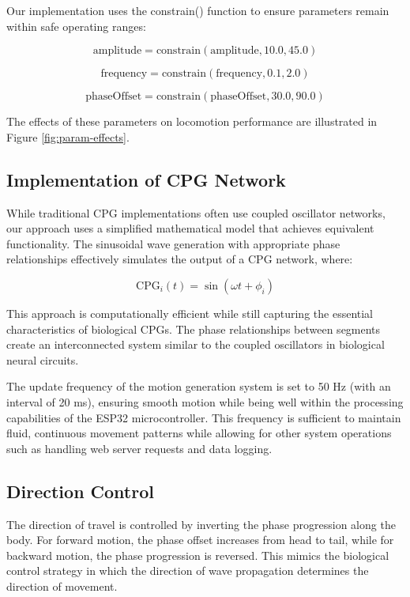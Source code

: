 \documentclass[12pt,a4paper]{report}
\begin{document}
Our implementation uses the constrain() function to ensure parameters remain within safe operating ranges:

\begin{equation}
\text{amplitude} = \text{constrain}(\text{amplitude}, 10.0, 45.0)
\end{equation}

\begin{equation}
\text{frequency} = \text{constrain}(\text{frequency}, 0.1, 2.0)
\end{equation}

\begin{equation}
\text{phaseOffset} = \text{constrain}(\text{phaseOffset}, 30.0, 90.0)
\end{equation}

The effects of these parameters on locomotion performance are illustrated in Figure \ref{fig:param-effects}.

\subsection{Implementation of CPG Network}
While traditional CPG implementations often use coupled oscillator networks, 
 our approach uses a simplified mathematical model that achieves equivalent functionality. The sinusoidal wave generation with appropriate phase relationships effectively simulates the output of a CPG network, where:

\begin{equation}
\text{CPG}_i(t) = \sin(\omega t + \phi_i)
\end{equation}

This approach is computationally efficient while still capturing the essential characteristics of biological CPGs. The phase relationships between segments create an interconnected system similar to the coupled oscillators in biological neural circuits.

The update frequency of the motion generation system is set to 50 Hz (with an interval of 20 ms), ensuring smooth motion while being well within the processing capabilities of the ESP32 microcontroller. This frequency is sufficient to maintain fluid, continuous movement patterns while allowing for other system operations such as handling web server requests and data logging.

\subsection{Direction Control}
The direction of travel is controlled by inverting the phase progression along the body. For forward motion, the phase offset increases from head to tail, while for backward motion, the phase progression is reversed. This mimics the biological control strategy in which the direction of wave propagation determines the direction of movement.
\end{document}
